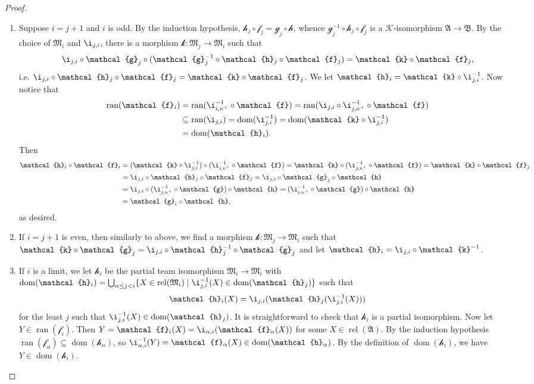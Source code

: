 \documentclass[a4paper]{amsart}
\theoremstyle{definition}
\theoremstyle{remark}
\newcommand{\A}{\mathcal{A}}
\newcommand{\B}{\mathcal{B}}
\newcommand{\M}{\mathcal{M}}
\DeclareMathOperator{\dom}{dom}
\DeclareMathOperator{\ran}{ran}
\DeclareMathOperator{\rel}{rel}
\newcommand{\K}{\mathcal{K}}
\theoremstyle{definition}
\renewcommand{\A}{\mathfrak{A}}
\renewcommand{\B}{\mathfrak{B}}
\renewcommand{\M}{\mathfrak{M}}
\newcommand{\f}{\mathcal{f}}
\newcommand{\g}{\mathcal{g}}
\newcommand{\h}{\mathcal{h}}
\renewcommand{\k}{\mathcal{k}}
\begin{document}
\begin{proof}
\begin{enumerate}
        \item Suppose $i = j+1$ and $i$ is odd. By the induction hypothesis, $\h_j\circ\f_j = \g_j\circ\h$, whence $\g_j^{-1}\circ\h_j\circ\f_j$ is a $\K$-isomorphism $\A\to\B$. By the choice of $\M_i$ and $\i_{j,i}$, there is a morphism $\k\colon\M_j\to\M_i$ such that
        \[
            \i_{j,i}\circ\g_j\circ(\g_j^{-1}\circ\h_j\circ\f_j) = \k\circ\f_j,
        \]
        i.e. $\i_{j,i}\circ\h_j\circ\f_j = \k\circ\f_j$.
        We let $\h_i = \k\circ\i_{j,i}^{-1}$. Now notice that
        \begin{align*}
            \ran(\f_i) &= \ran(\i_{i,\kappa^+}^{-1}\circ\f) = \ran(\i_{j,i}\circ\i_{j,\kappa^+}^{-1}\circ\f) \\
            &\subseteq \ran(\i_{j,i}) = \dom(\i_{j,i}^{-1}) = \dom(\k\circ\i_{j,i}^{-1}) \\
            &= \dom(\h_i).
        \end{align*}
        Then
        \begin{align*}
            \h_i\circ\f_i &= (\k\circ\i_{j,i}^{-1})\circ(\i_{i,\kappa^+}^{-1}\circ\f) = \k\circ(\i_{j,\kappa^+}^{-1}\circ\f) = \k\circ\f_j \\
            &= \i_{j,i}\circ\h_j\circ\f_j = \i_{j,i}\circ\g_j\circ\h \\
            &= \i_{j,i}\circ(\i_{j,\kappa^+}^{-1}\circ\g)\circ\h = (\i_{i,\kappa^+}^{-1}\circ\g)\circ\h \\
            &= \g_i\circ\h,
        \end{align*}
        as desired.

        \item If $i = j+1$ is even, then similarly to above, we find a morphism $\k\colon\M_j\to\M_i$ such that $\k\circ\g_j = \i_{j,i}\circ\h_j^{-1}\circ\g_j$ and let $\h_i = \i_{j,i}\circ\k^{-1}$.

        \item If $i$ is a limit, we let $\h_i$ be the partial team isomorphism $\M_i\to\M_i$ with $\dom(\h_i) = \bigcup_{\alpha\leq j<i}\{X\in\rel(\M_i) \mid \i_{j,i}^{-1}(X)\in\dom(\h_j) \}$ such that
        \[
            \h_i(X) = \i_{j,i}(\h_j(\i_{j,i}^{-1}(X)))
        \]
        for the least $j$ such that $\i_{j,i}^{-1}(X)\in\dom(\h_j)$. It is straightforward to check that $\h_i$ is a partial isomorphism. Now let $Y\in\ran(\f_i)$. Then $Y = \f_i(X) = \i_{\alpha,i}(\f_\alpha(X))$ for some $X\in\rel(\A)$. By the induction hypothesis $\ran(\f_\alpha)\subseteq\dom(\h_\alpha)$, so $\i_{\alpha,i}^{-1}(Y) = \f_\alpha(X)\in\dom(\h_\alpha)$. By the definition of $\dom(\h_i)$, we have $Y\in\dom(\h_i)$.


\end{enumerate}
\end{proof}
\end{document}
